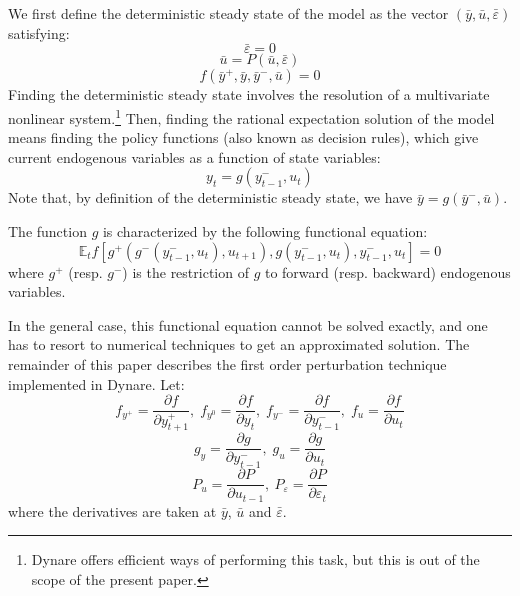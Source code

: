 \documentclass[11pt,a4paper]{article}
\begin{document}
We first define the deterministic steady state of the model as the vector
$(\bar{y}, \bar{u}, \bar{\varepsilon})$ satisfying:
\begin{equation*}
  \bar{\varepsilon} = 0
\end{equation*}
\begin{equation*}
  \bar{u} = P(\bar{u}, \bar{\varepsilon})
\end{equation*}
\begin{equation*}
  f(\bar{y}^+, \bar{y}, \bar{y}^-, \bar{u}) = 0
\end{equation*}
Finding the deterministic steady state involves the resolution of a
multivariate nonlinear system.\footnote{Dynare offers efficient ways of
  performing this task, but this is out of the scope of the present paper.}
Then, finding the rational expectation solution of the model means finding the
policy functions (also known as decision rules), which give current endogenous
variables as a function of state variables:
\begin{equation*}
  y_t = g(y^-_{t-1}, u_t)
\end{equation*}
Note that, by definition of the deterministic steady state, we have $\bar{y} =
g(\bar{y}^-, \bar{u})$.

The function $g$ is characterized by the following functional equation:
\begin{equation}
  \label{eq:g-definition}
  \mathbb{E}_t f\left[g^+(g^-(y^-_{t-1}, u_t), u_{t+1}), g(y^-_{t-1}, u_t), y^-_{t-1}, u_t\right] = 0
\end{equation}
where $g^+$ (resp. $g^-$) is the restriction of $g$ to forward (resp. backward)
endogenous variables.

In the general case, this functional equation cannot be solved exactly, and one
has to resort to numerical techniques to get an approximated solution. The
remainder of this paper describes the first order perturbation technique
implemented in Dynare. Let:
\begin{equation*}
  f_{y^+} = \frac{\partial f}{\partial y^+_{t+1}}, \; f_{y^0} = \frac{\partial f}{\partial y_t}, \;  f_{y^-} = \frac{\partial f}{\partial y^-_{t-1}}, \;
  f_u   = \frac{\partial f}{\partial u_t}
\end{equation*}
\begin{equation*}
  g_y = \frac{\partial g}{\partial y^-_{t-1}},\;
  g_u = \frac{\partial g}{\partial u_t}
\end{equation*}
\begin{equation*}
  P_u = \frac{\partial P}{\partial u_{t-1}}, \:
  P_\varepsilon = \frac{\partial P}{\partial \varepsilon_t}
\end{equation*}
where the derivatives are taken at $\bar{y}$, $\bar{u}$ and
$\bar{\varepsilon}$.
\end{document}
